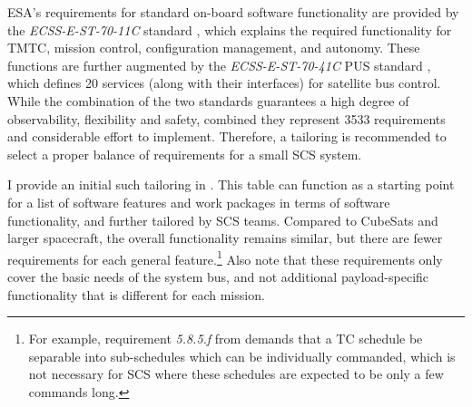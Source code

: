 \documentclass[a4paper,nobib,justified,final]{tufte-book}
\begin{document}
\acs{ESA}'s requirements for standard on-board software functionality are provided by the \emph{ECSS-E-ST-70-11C} standard \autocite{ECSS-E-ST-70-11C}, which explains the required functionality for \ac{TMTC}, mission control, configuration management, and autonomy. These functions are further augmented by the \emph{ECSS-E-ST-70-41C} \acf{PUS} standard \autocite{ECSS-E-ST-70-41C}, which defines 20 services (along with their interfaces) for satellite bus control. While the combination of the two standards guarantees a high degree of observability, flexibility and safety, combined they represent \num{3533} requirements and considerable effort to implement. Therefore, a tailoring is recommended to select a proper balance of requirements for a small SCS system.

I provide an initial such tailoring in . This table can function as a starting point for a list of software features and work packages in terms of software functionality, and further tailored by \acs{SCS} teams. Compared to CubeSats and larger spacecraft, the overall functionality remains similar, but there are fewer requirements for each general feature.\footnote{For example, requirement \emph{5.8.5.f} from \cite{ECSS-E-ST-70-11C} demands that a \acs{TC} schedule be separable into sub-schedules which can be individually commanded, which is not necessary for \acs{SCS} where these schedules are expected to be only a few commands long.} Also note that these requirements only cover the basic needs of the system bus, and not additional payload-specific functionality that is different for each mission.
\end{document}
